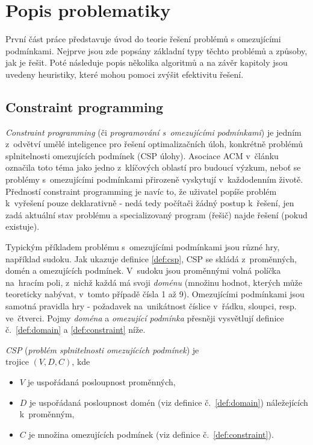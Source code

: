 

\chapter{Popis problematiky}
První část práce představuje úvod do teorie řešení problémů s omezujícími podmínkami. Nejprve jsou zde popsány základní typy těchto problémů a způsoby, jak je řešit. Poté následuje popis několika algoritmů a na závěr kapitoly jsou uvedeny heuristiky, které mohou pomoci zvýšit efektivitu řešení.


\section{Constraint programming}
\emph{Constraint programming} (či \emph{programování s~omezujícími podmínkami}) je jedním z~odvětví umělé inteligence pro řešení optimalizačních úloh, konkrétně problémů splnitelnosti omezujících podmínek (CSP úlohy). Asociace ACM v~článku \cite{Wegner1996} označila toto téma jako jedno z~klíčových oblastí pro budoucí výzkum, neboť se problémy s~omezujícími podmínkami přirozeně vyskytují v~každodenním životě. Předností constraint programming je navíc to, že uživatel popíše problém k~vyřešení pouze deklarativně - nedá tedy počítači žádný postup k~řešení, jen zadá aktuální stav problému a specializovaný program (řešič) najde řešení (pokud existuje).

Typickým příkladem problému s~omezujícími podmínkami jsou různé hry, například sudoku. Jak ukazuje definice \ref{def:csp}, CSP se skládá z~proměnných, domén a omezujících podmínek. V~sudoku jsou proměnnými volná políčka na~hracím poli, z~nichž každá má svoji \emph{doménu} (množinu hodnot, kterých může teoreticky nabývat, v~tomto případě čísla 1 až 9). Omezujícími podmínkami jsou samotná pravidla hry - požadavek na~unikátnost číslice v~řádku, sloupci, resp. ve~čtverci. Pojmy \emph{doména} a \emph{omezující podmínka} přesněji vysvětlují definice č.~\ref{def:domain} a \ref{def:constraint} níže.

\begin{definition}
\label{def:csp}
\emph{CSP} (\emph{problém splnitelnosti omezujících podmínek}) je \\ trojice $(V, D, C)$, kde
\begin{itemize}
  \item $V$ je uspořádaná posloupnost proměnných,
  \item $D$ je uspořádaná posloupnost domén (viz definice č.~\ref{def:domain}) náležejících k~proměnným,
  \item $C$ je množina omezujících podmínek (viz definice č.~\ref{def:constraint}).
\end{itemize}
\end{definition}

